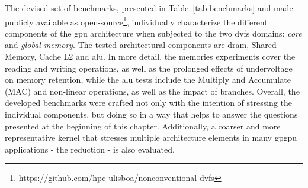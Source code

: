 The devised set of benchmarks,  presented in Table~\ref{tab:benchmarks} and made publicly available as open-source\footnote{https://github.com/hpc-ulisboa/nonconventional-dvfs}, individually characterize the different components of the \acrshort{gpu} architecture when subjected to the two \acrshort{dvfs} domains: \textit{core} and \textit{global memory}. The tested architectural components are \acrshort{dram}, Shared Memory, Cache L2 and \acrshort{alu}. In more detail, the memories experiments cover the reading and writing operations, as well as the prolonged effects of undervoltage on memory retention, while the \acrshort{alu} tests include the Multiply and Accumulate (MAC) and non-linear operations, as well as the impact of branches. Overall, the developed benchmarks were crafted not only with the intention of stressing the individual components, but doing so in a way that helps to answer the questions presented at the beginning of this chapter. Additionally, a coarser and more representative kernel that stresses multiple architecture elements in many \acrshort{gpgpu} applications - the reduction - is also evaluated.


